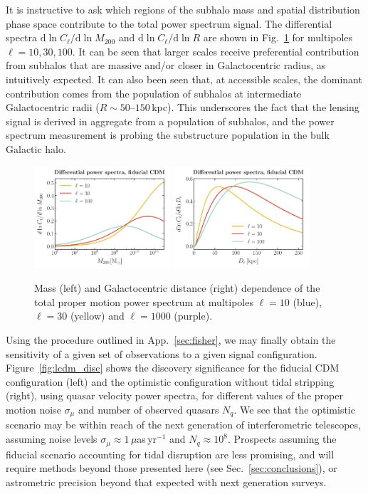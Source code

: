 \documentclass[prd,aps,10pt,nofootinbib,twocolumn,superscriptaddress,preprintnumbers,balancelastpage,longbibliography]{revtex4-1}
\newcommand{\dd}{\mathrm{d}}
\begin{document}
It is instructive to ask which regions of the subhalo mass and spatial distribution phase space contribute to the total power spectrum signal. The differential spectra $\dd\ln C_\ell/\dd\ln M_{200}$ and $\dd\ln C_\ell/\dd\ln R$ are shown in Fig.~\ref{fig:pspec_differential} for multipoles $\ell=10, 30, 100$. It can be seen that larger scales receive preferential contribution from subhalos that are massive and/or closer in Galactocentric radius, as intuitively expected. It can also been seen that, at accessible scales, the dominant contribution comes from the population of subhalos at intermediate Galactocentric radii ($R\sim50$--$150$\,kpc). This underscores the fact that the lensing signal is derived in aggregate from a population of subhalos, and the power spectrum measurement is probing the substructure population in the bulk Galactic halo.


\begin{figure}[!htbp]
  \centering
  \includegraphics[width=0.45\textwidth]{plots/dlnCldlnM200}
  \includegraphics[width=0.45\textwidth]{plots/dlnCldlnR}
  \caption{Mass (left) and Galactocentric distance (right) dependence of the total proper motion power spectrum at multipoles $\ell=10$ (blue), $\ell=30$ (yellow) and $\ell=1000$ (purple).} \label{fig:pspec_differential}
\end{figure}

Using the procedure outlined in App.~\ref{sec:fisher}, we may finally obtain the sensitivity of a given set of observations to a given signal configuration. Figure~\ref{fig:lcdm_disc} shows the discovery significance for the fiducial CDM configuration (left) and the optimistic configuration without tidal stripping (right), using quasar velocity power spectra, for different values of the proper motion noise $\sigma_\mu$ and number of observed quasars $N_q$. We see that the optimistic scenario may be within reach of the next generation of interferometric telescopes, assuming noise levels $\sigma_\mu\approx 1\,\mu$as\,yr$^{-1}$ and $N_q\approx10^8$. Prospects assuming the fiducial scenario accounting for tidal disruption are less promising, and will require methods beyond those presented here (see Sec.~\ref{sec:conclusions}), or astrometric precision beyond that expected with next generation surveys.
\end{document}

